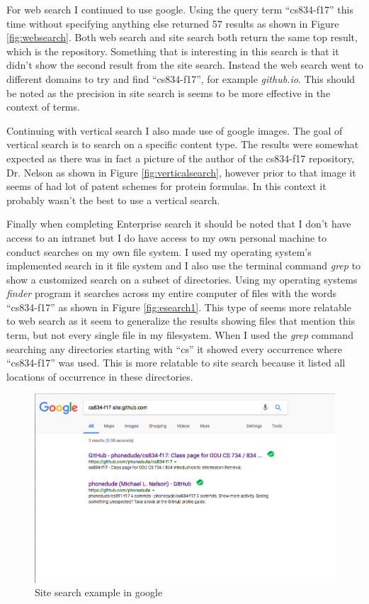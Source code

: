 \documentclass[letterpaper,11pt]{article}
\begin{document}
For web search I continued to use google. Using the query term ``cs834-f17'' this time without specifying anything else returned 57 results as shown in Figure \ref{fig:websearch}. 
Both web search and site search both return the same top result, which is the repository. Something that is interesting in this search is that it didn't show the second result
from the site search. Instead the web search went to different domains to try and find ``cs834-f17'', for example \textit{github.io}. This should be noted as the precision in site search
is seems to be more effective in the context of terms. 

Continuing with vertical search I also made use of google images. The goal of vertical search is to search on a specific content type.
The results were somewhat expected as there was in fact a picture of the author of the cs834-f17 repository, Dr. Nelson as shown in Figure \ref{fig:verticalsearch}, however prior to that image it seems of had lot of patent schemes for protein formulas. In this context it probably wasn't the best to use a vertical search.

Finally when completing Enterprise search it should be noted that I don't have access to an intranet but I do have access to my own personal machine to conduct searches on my own file system. 
I used my operating system's implemented search in it file system and I also use the terminal command \textit{grep} to show a customized search on a subset of directories.
Using my operating systems \textit{finder} program it searches across my entire computer of files with the words ``cs834-f17'' as shown in Figure \ref{fig:esearch1}. This type of seems more relatable to web search as it seem to generalize the results showing files that mention this term, but not every single file in my filesystem.
When I used the \textit{grep} command searching any directories starting with ``cs'' it showed every occurrence where ``cs834-f17'' was used. This is more relatable to site search because it listed all locations of occurrence in these directories.

  \begin{figure}[h]
  \centering
  \includegraphics[scale=0.4]{sitesearch.png}
  \caption{Site search example in google}
  \label{fig:sitesearch}
  \end{figure}
\end{document}

